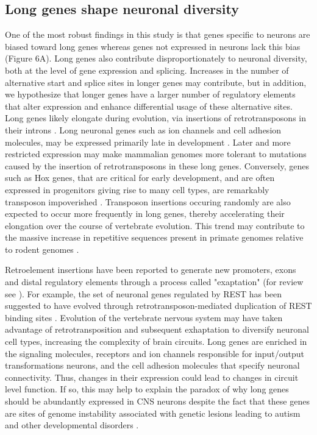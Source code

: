 \subsection{Long genes shape neuronal diversity}
One of the most robust findings in this study is that genes specific to neurons are biased toward long genes whereas genes not expressed in neurons lack this bias (Figure 6A). Long genes also contribute disproportionately to neuronal diversity, both at the level of gene expression and splicing. Increases in the number of alternative start and splice sites in longer genes may contribute, but in addition, we hypothesize that longer genes have a larger number of regulatory elements that alter expression and enhance differential usage of these alternative sites. Long genes likely elongate during evolution, via insertions of retrotransposons in their introns \cite{Sela_2007,Grishkevich_2014}. Long neuronal genes such as ion channels and cell adhesion molecules, may be expressed primarily late in development \cite{Okaty_2009}. Later and more restricted expression may make mammalian genomes more tolerant to mutations caused by the insertion of retrotransposons in these long genes. Conversely, genes such as Hox genes, that are critical for early development, and are often expressed in progenitors giving rise to many cell types, are remarkably transposon impoverished \cite{Chinwalla_2002,Simons_2005}. Transposon insertions occuring randomly are also expected to occur more frequently in long genes, thereby accelerating their elongation over the course of vertebrate evolution. This trend may contribute to the massive increase in repetitive sequences present in primate genomes relative to rodent genomes \cite{Chuong_2016}.

Retroelement insertions have been reported to generate new promoters, exons and distal regulatory elements through a process called "exaptation" (for review see \cite{Chuong_2016}). For example, the set of neuronal genes regulated by REST has been suggested to have evolved through retrotransposon-mediated duplication of REST binding sites \cite{Johnson_2006}. Evolution of the vertebrate nervous system may have taken advantage of retrotransposition and subsequent exhaptation to diversify neuronal cell types, increasing the complexity of brain circuits. Long genes are enriched in the signaling molecules, receptors and ion channels responsible for input/output transformations neurons, and the cell adhesion molecules that specify neuronal connectivity. Thus, changes in their expression could lead to changes in circuit level function. If so, this may help to explain the paradox of why long genes should be abundantly expressed in CNS neurons despite the fact that these genes are sites of  genome instability associated with genetic lesions leading to autism and other developmental disorders \cite{Wei_2016}.

